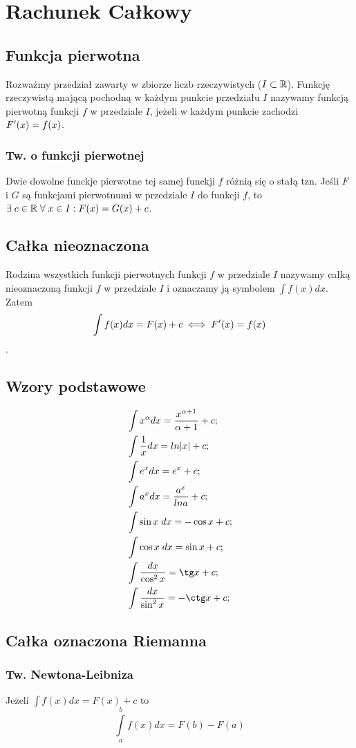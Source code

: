 \documentclass[../Matematyka.tex]{subfiles}
\begin{document}
    \section{Rachunek Całkowy}

    \subsection{Funkcja pierwotna}
    Rozważmy przedział zawarty w zbiorze liczb rzeczywistych (\(I \subset \mathbb{R}\)). Funkcję rzeczywistą mającą pochodną w każdym
    punkcie przedziału \(I\) nazywamy funkcją pierwotną funkcji \(f\) w przedziale \(I\), jeżeli w każdym punkcie zachodzi \(F^\prime(x) = f(x)\).

    \subsubsection{Tw. o funkcji pierwotnej}
    Dwie dowolne funckje pierwotne tej samej funckji \(f\) różnią się o stałą tzn.
    Jeśli \(F\) i \(G\) są funkcjami pierwotnumi w przedziale \(I\) do funkcji \(f\), to \(\exists\;c \in \mathbb{R}\;\forall\;x \in I : F(x) = G(x) + c\).

    \subsection{Całka nieoznaczona}
    Rodzina wszystkich funkcji pierwotnych funkcji \(f\) w przedziale \(I\) nazywamy całką nieoznaczoną funkcji \(f\) w przedziale \(I\) i oznaczamy ją symbolem \(\int f(x)dx\). Zatem
    \[\int f(x)dx = F(x) + c \iff F^\prime(x) = f(x)\].

    \subsection{Wzory podstawowe}
    \begin{align}
        &\int x^\alpha dx = \frac{x^{\alpha+1}}{\alpha+1} + c; \\
        &\int \frac{1}{x}dx = ln|x| + c; \\
        &\int e^xdx = e^x + c; \\
        &\int a^xdx = \frac{a^x}{lna} + c; \\
        &\int \sin x\;dx = -\cos x + c; \\
        &\int \cos x\;dx = \sin x + c; \\
        &\int \frac{dx}{\cos^2 x} = \tg x + c; \\
        &\int \frac{dx}{\sin^2 x} = -\ctg x + c;
    \end{align}

    \subsection{Całka oznaczona Riemanna}
    \subsubsection{Tw. Newtona-Leibniza}
    Jeżeli \(\int f(x)dx = F(x) + c\) to
    \[\int\limits_a^b f(x)dx = F(b) - F(a)\]
\end{document}
